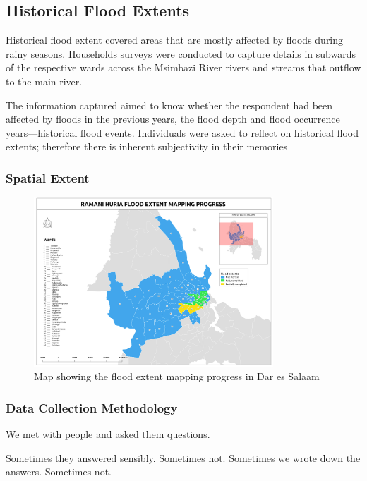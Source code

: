 \documentclass[a4paper,12pt,twoside]{article}
\begin{document}
\newpage
\subsection{Historical Flood Extents}

Historical flood extent covered areas that are mostly affected by floods during rainy seasons. Households surveys were conducted to capture details in  subwards of the respective wards across the Msimbazi River rivers and streams that outflow to the main river.

\medskip

The information captured aimed to know whether the respondent had been affected by floods in the previous years, the flood depth and flood occurrence years---historical flood events. Individuals were asked to reflect on historical flood extents; therefore there is inherent subjectivity in their memories

\subsubsection{Spatial Extent}

\begin{figure}[h]
  \color{RHgreen}\caption{Map showing the flood extent mapping progress in Dar es Salaam}
  \centering
  \includegraphics[width=0.8\textwidth]{images/RH_Flood_Extent_Progress.png}
\end{figure}

\subsubsection{Data Collection Methodology}

We met with people and asked them questions.

Sometimes they answered sensibly. Sometimes not. Sometimes we wrote down the answers. Sometimes not.
\end{document}
